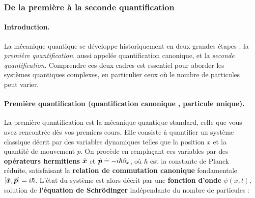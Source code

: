 \subsubsection{De la première à la seconde quantification}

\paragraph{Introduction.}

La mécanique quantique se développe historiquement en deux grandes étapes : la \emph{première quantification}, aussi appelée quantification canonique, et la \emph{seconde quantification}. Comprendre ces deux cadres est essentiel pour aborder les systèmes quantiques complexes, en particulier ceux où le nombre de particules peut varier.




\paragraph{Première quantification (quantification canonique , particule unique).}

La première quantification est la mécanique quantique standard, celle que vous avez rencontrée dès vos premiers cours. Elle consiste à quantifier un système classique décrit par des variables dynamiques telles que la position $x$ et la quantité de mouvement $p$. On procède en remplaçant ces variables par des {\bf opérateurs hermitiens} $\hat{\bm{x}}$ et $\hat{\bm{p}} \doteq -i\hbar \partial_x $, où $\hbar$ est la constante de Planck réduite, satisfaisant la {\bf relation de commutation canonique} fondamentale $[\hat{\bm{x}}, \hat{\bm{p}}] = i\hbar$. L’état du système est alors décrit par une {\bf fonction d’onde} $\psi(x,t)$, solution de {\bf l’équation de  Schrödinger} indépendante du nombre de particules :


